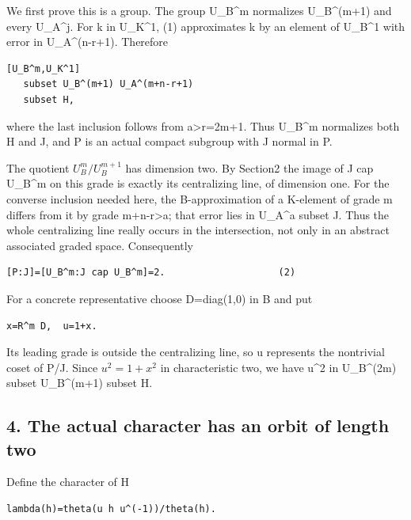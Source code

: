 We first prove this is a group. The group U\_B\^{}m normalizes
U\_B\^{}(m+1) and every U\_A\^{}j. For k in U\_K\^{}1, (1) approximates
k by an element of U\_B\^{}1 with error in U\_A\^{}(n-r+1). Therefore

\begin{Verbatim}[fontsize=\small,breaklines=true,breakanywhere=true]
[U_B^m,U_K^1]
   subset U_B^(m+1) U_A^(m+n-r+1)
   subset H,
\end{Verbatim}

where the last inclusion follows from a\textgreater r=2m+1. Thus
U\_B\^{}m normalizes both H and J, and P is an actual compact subgroup
with J normal in P.

The quotient \(U_B^m/U_B^{m+1}\) has dimension two. By
Section2 the image of J cap U\_B\^{}m on this grade is exactly its
centralizing line, of dimension one. For the converse inclusion needed
here, the B-approximation of a K-element of grade m differs from it by
grade m+n-r\textgreater a; that error lies in U\_A\^{}a subset J. Thus
the whole centralizing line really occurs in the intersection, not only
in an abstract associated graded space. Consequently

\begin{Verbatim}[fontsize=\small,breaklines=true,breakanywhere=true]
[P:J]=[U_B^m:J cap U_B^m]=2.                    (2)
\end{Verbatim}

For a concrete representative choose D=diag(1,0) in B and put

\begin{Verbatim}[fontsize=\small,breaklines=true,breakanywhere=true]
x=R^m D,  u=1+x.
\end{Verbatim}

Its leading grade is outside the centralizing line, so u represents the
nontrivial coset of P/J. Since \(u^2=1+x^2\) in
characteristic two, we have u\^{}2 in U\_B\^{}(2m) subset U\_B\^{}(m+1)
subset H.

\hypertarget{rank4-the-actual-character-has-an-orbit-of-length-two}{%
\subsection{4. The actual character has an orbit of length
two}\label{rank4-the-actual-character-has-an-orbit-of-length-two}}

Define the character of H

\begin{Verbatim}[fontsize=\small,breaklines=true,breakanywhere=true]
lambda(h)=theta(u h u^(-1))/theta(h).
\end{Verbatim}

